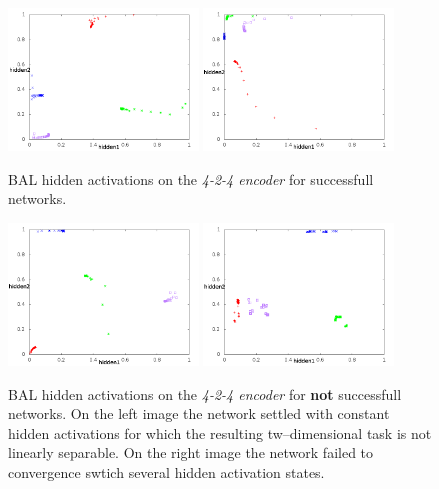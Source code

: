 
\begin{figure}[H]
  \centering
  \includegraphics[width=0.45\textwidth]{../presentation/img/nice.png}   
  \includegraphics[width=0.45\textwidth]{../presentation/img/left_top.png}    
  \caption{BAL hidden activations on the \emph{4-2-4 encoder} for successfull networks.}
  \label{fig:results-hidden-activations-bal-good}
\end{figure}

\begin{figure}[H]
  \centering
  \includegraphics[width=0.45\textwidth]{../presentation/img/tazisko.png}   
  \includegraphics[width=0.45\textwidth]{../presentation/img/non-convergent.png}    
  \caption{BAL hidden activations on the \emph{4-2-4 encoder} for {\bf not} successfull networks. On the left image the network settled with constant hidden activations for which the resulting tw--dimensional task is not linearly separable. On the right image the network failed to convergence swtich several hidden activation states.}
  \label{fig:results-hidden-activations-bal-bad}
\end{figure}


